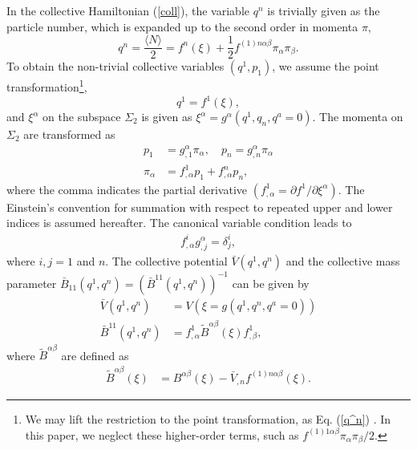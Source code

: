 \documentclass[%
superscriptaddress,
showpacs,
nofootinbib,
amsmath,amssymb,
aps,
prc,
twocolumn,
floatfix ]%
{revtex4-1}
\begin{document}
In the collective Hamiltonian (\ref{coll}), the variable $q^n$ is
trivially given as the particle number, which is expanded up to the
second order in momenta $\pi$,
\begin{equation}
q^n=\frac{\langle N \rangle}{2} = f^n(\xi)
	+\frac{1}{2}f^{(1)n\alpha\beta}\pi_\alpha\pi_\beta .
	\label{q^n}
\end{equation}
To obtain the non-trivial collective variables
$(q^1,p_1)$, we assume the point transformation\footnote{
We may lift the restriction to the point transformation,
as Eq. (\ref{q^n}) \cite{Sat18}.
In this paper, we neglect these higher-order terms, such as
$f^{(1)1\alpha\beta}\pi_\alpha\pi_\beta/2$.
},
\begin{equation}
  q^1 = f^1(\xi) \label{point} ,
\end{equation}
and $\xi^\alpha$ on the subspace $\Sigma_2$ is given as
$\xi^{\alpha} = g^{\alpha}(q^1,q_n,q^a=0)$.
The momenta on $\Sigma_2$ are transformed as
\begin{align}
p_1 &= g_{,1}^{\alpha}\pi_{\alpha} , \quad p_n = g_{,n}^\alpha \pi_\alpha \\
\pi_{\alpha} &= f^1_{,\alpha}p_1 +f^n_{,\alpha}p_n,
 \label{momenta}
\end{align}
where the comma indicates the partial derivative
$(f^1_{,\alpha}=\partial f^1/\partial \xi^{\alpha})$. 
The Einstein's convention for summation with respect to repeated
upper and lower indices is assumed hereafter.
The canonical variable condition leads to
\begin{align}
f^i_{,\alpha}g_{,j}^{\alpha} = \delta^i_j,
  \label{canonicity}
\end{align}
where $i,j=1$ and $n$.
The collective potential $\bar{V}(q^1,q^n)$ and
the collective mass parameter
$\bar{B}_{11}(q^1,q^n)=(\bar{B}^{11}(q^1,q^n))^{-1}$ can be given by
\begin{align}
\bar{V}(q^1,q^n) &= V(\xi=g(q^1,q^n,q^a=0)) \\
\bar{B}^{11}(q^1,q^n) &= f^1_{,\alpha}\tilde{B}^{\alpha\beta}(\xi)f^1_{,\beta} ,
  \label{coll_mass}
\end{align}
where $\tilde{B}^{\alpha\beta}$ are defined as
\begin{align}
 \tilde{B}^{\alpha\beta}(\xi)
&= B^{\alpha\beta}(\xi) - \bar{V}_{,n} f^{(1)n\alpha\beta}(\xi)
\label{tildeB}.
\end{align} 
\end{document}
